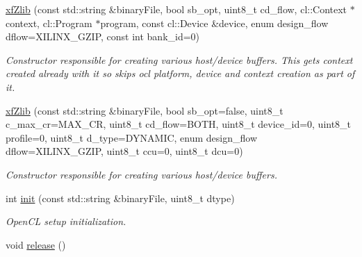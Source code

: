 \begin{DoxyCompactItemize}
\item 
\hypertarget{classxf_1_1compression_1_1xfZlib_abed5b0a998fd1b3f7a8236927bd099a4}{\hyperlink{classxf_1_1compression_1_1xfZlib_abed5b0a998fd1b3f7a8236927bd099a4}{xf\-Zlib} (const std\-::string \&binary\-File, bool sb\-\_\-opt, uint8\-\_\-t cd\-\_\-flow, cl\-::\-Context $\ast$context, cl\-::\-Program $\ast$program, const cl\-::\-Device \&device, enum design\-\_\-flow dflow=X\-I\-L\-I\-N\-X\-\_\-\-G\-Z\-I\-P, const int bank\-\_\-id=0)}\label{classxf_1_1compression_1_1xfZlib_abed5b0a998fd1b3f7a8236927bd099a4}

\begin{DoxyCompactList}\small\item\em Constructor responsible for creating various host/device buffers. This gets context created already with it so skips ocl platform, device and context creation as part of it. \end{DoxyCompactList}\item 
\hypertarget{classxf_1_1compression_1_1xfZlib_a329922295001165915c6bce0ba7cbdbd}{\hyperlink{classxf_1_1compression_1_1xfZlib_a329922295001165915c6bce0ba7cbdbd}{xf\-Zlib} (const std\-::string \&binary\-File, bool sb\-\_\-opt=false, uint8\-\_\-t c\-\_\-max\-\_\-cr=M\-A\-X\-\_\-\-C\-R, uint8\-\_\-t cd\-\_\-flow=B\-O\-T\-H, uint8\-\_\-t device\-\_\-id=0, uint8\-\_\-t profile=0, uint8\-\_\-t d\-\_\-type=D\-Y\-N\-A\-M\-I\-C, enum design\-\_\-flow dflow=X\-I\-L\-I\-N\-X\-\_\-\-G\-Z\-I\-P, uint8\-\_\-t ccu=0, uint8\-\_\-t dcu=0)}\label{classxf_1_1compression_1_1xfZlib_a329922295001165915c6bce0ba7cbdbd}

\begin{DoxyCompactList}\small\item\em Constructor responsible for creating various host/device buffers. \end{DoxyCompactList}\item 
int \hyperlink{classxf_1_1compression_1_1xfZlib_a87f13a66b1928934295c46677666fabe}{init} (const std\-::string \&binary\-File, uint8\-\_\-t dtype)
\begin{DoxyCompactList}\small\item\em Open\-C\-L setup initialization. \end{DoxyCompactList}\item 
\hypertarget{classxf_1_1compression_1_1xfZlib_a161a134c573011f422026e83597b96b3}{void \hyperlink{classxf_1_1compression_1_1xfZlib_a161a134c573011f422026e83597b96b3}{release} ()}\label{classxf_1_1compression_1_1xfZlib_a161a134c573011f422026e83597b96b3}


\end{DoxyCompactItemize}
